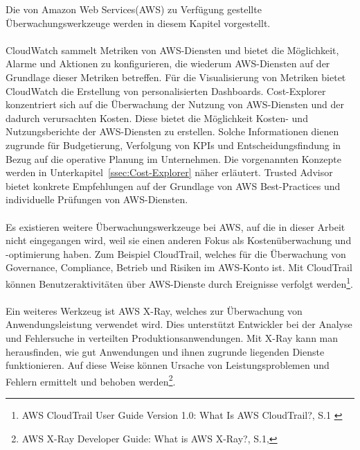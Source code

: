 Die von Amazon Web Services(AWS) zu Verfügung gestellte Überwachungswerkzeuge werden in diesem Kapitel vorgestellt. %
\\\\
CloudWatch sammelt Metriken von AWS-Diensten und bietet die Möglichkeit, Alarme und Aktionen zu konfigurieren, die wiederum AWS-Diensten auf der Grundlage dieser Metriken betreffen. Für die Visualisierung von Metriken bietet CloudWatch die Erstellung von personalisierten Dashboards.
Cost-Explorer konzentriert sich auf die Überwachung der Nutzung von AWS-Diensten und der dadurch verursachten Kosten. Diese bietet die Möglichkeit Kosten- und Nutzungsberichte der AWS-Diensten zu erstellen. Solche Informationen dienen zugrunde für Budgetierung, %
Verfolgung von KPIs und Entscheidungsfindung in Bezug auf die operative Planung im Unternehmen. Die vorgenannten Konzepte werden in Unterkapitel~\ref{ssec:Cost-Explorer} näher erläutert. %
Trusted Advisor bietet konkrete Empfehlungen auf der Grundlage von AWS Best-Practices und individuelle Prüfungen von AWS-Diensten.
\\\\
Es existieren weitere Überwachungswerkzeuge bei AWS, auf die in dieser Arbeit nicht eingegangen wird, weil sie einen anderen Fokus als Kostenüberwachung und -optimierung haben. Zum Beispiel CloudTrail, welches für die Überwachung von Governance, Compliance, Betrieb und Risiken im AWS-Konto ist. Mit CloudTrail können Benutzeraktivitäten über AWS-Dienste durch Ereignisse verfolgt werden\footnote{AWS CloudTrail User Guide Version 1.0: What Is AWS CloudTrail?, S.1 \cite{AMZ27}}.
\\\\
Ein weiteres Werkzeug ist AWS X-Ray, welches zur Überwachung von Anwendungsleistung verwendet wird. Dies unterstützt Entwickler bei der Analyse und Fehlersuche in verteilten Produktionsanwendungen. Mit X-Ray kann man herausfinden, wie gut Anwendungen und ihnen zugrunde liegenden Dienste funktionieren. Auf diese Weise können Ursache von Leistungsproblemen und Fehlern ermittelt und behoben werden\footnote{AWS X-Ray Developer Guide: What is AWS X-Ray?, S.1\cite{AMZ27},}.
\newpage


